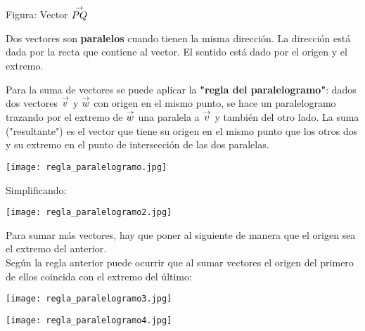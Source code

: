 \begin{center}
    Figura: Vector $\stackrel{\to}{PQ}$ 
\end{center}

Dos vectores son \textbf{paralelos} cuando tienen la misma dirección. La dirección está dada por la recta que contiene al vector. El sentido está dado por el origen y el extremo.



Para la suma de vectores se puede aplicar la \textbf{"regla del paralelogramo"}: dados dos vectores $\stackrel{\to}{v}$ y $\stackrel{\to}{w}$ con origen en el mismo punto, se hace un paralelogramo trazando por el extremo de $\stackrel{\to}{w}$ una paralela a $\stackrel{\to}{v}$ y también del otro lado. La suma ("resultante") es el vector que tiene su origen en el mismo punto que los otros dos y su extremo en el punto de intersección de las dos paralelas.

\begin{center}
    \texttt{[image: regla\_paralelogramo.jpg]}
\end{center}
Simplificando: 
\begin{center}    
    \texttt{[image: regla\_paralelogramo2.jpg]}
\end{center}

Para sumar más vectores, hay que poner al siguiente de manera que el origen sea el extremo del anterior.\\
Según la regla anterior puede ocurrir que al sumar vectores el origen del primero de
ellos coincida con el extremo del último:
\begin{center}    
    \texttt{[image: regla\_paralelogramo3.jpg]}
\end{center}
\begin{center}    
    \texttt{[image: regla\_paralelogramo4.jpg]}
\end{center}


